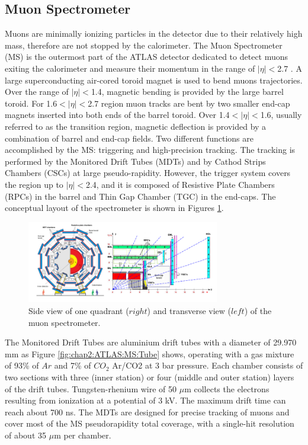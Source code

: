 \subsection{Muon Spectrometer}
\label{chap2:ATLAS:MS}
Muons are minimally ionizing particles in the detector due to their relatively high mass, therefore are not stopped by the calorimeter. The Muon Spectrometer (MS) is the outermost part of the ATLAS detector dedicated to detect muons exiting the calorimeter and measure their momentum in the range of $|\eta|<$2.7 \cite{Muon_TDR}. A large superconducting air-cored toroid magnet is used to bend muons trajectories. Over the range of $|\eta|<$1.4, magnetic bending is provided by the large barrel toroid. For 1.6$<|\eta|<$2.7 region muon tracks are bent by two smaller end-cap magnets inserted into both ends of the barrel toroid. Over 1.4$<|\eta|<$1.6, usually referred to as the transition region, magnetic deflection is provided by a combination of barrel and end-cap fields. Two different functions are accomplished by the MS: triggering and high-precision tracking. The tracking is performed by the Monitored Drift Tubes (MDTs) and by Cathod Strips Chambers (CSCs) at large pseudo-rapidity. However, the trigger system covers the region up to $|\eta|<$2.4, and it is composed of Resistive Plate Chambers (RPCs) in the barrel and Thin Gap Chamber (TGC) in the end-caps. The conceptual layout of the spectrometer is shown in Figures \ref{fig:chap2:ATLAS:MS}. \\
\begin{figure}[htbp]
    \centering
    \includegraphics[width=0.75\textwidth]{Ch2/Img/Muon.png}
    \caption{Side view of one quadrant ($right$) and transverse view ($left$) of the muon spectrometer.}
    \label{fig:chap2:ATLAS:MS}
\end{figure}
The Monitored Drift Tubes are aluminium drift tubes with a diameter of 29.970 mm as Figure \ref{fig:chap2:ATLAS:MS:Tube} shows, operating with a gas mixture of 93\% of $Ar$ and 7\% of $CO_2$ Ar/CO2 at 3 bar pressure. Each chamber consists of two sections with three (inner station) or four (middle and outer station) layers of the drift tubes. Tungsten-rhenium wire of 50 $\mu$m collects the electrons resulting from ionization at a potential of 3 kV. The maximum drift time can reach about 700 ns. The MDTs are designed for precise tracking of muons and cover most of the MS pseudorapidity total coverage, with a single-hit resolution of about 35 $\mu$m per chamber. \\
